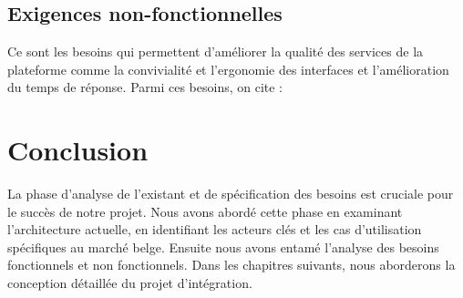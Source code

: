 \subsection{Exigences non-fonctionnelles}


Ce sont les besoins qui permettent d’améliorer la qualité des services de la plateforme comme la convivialité et l’ergonomie des interfaces et l’amélioration du temps de réponse. Parmi ces besoins, on cite :

\section*{Conclusion}
La phase d'analyse de l'existant et de spécification des besoins est cruciale pour le succès de notre projet. Nous avons abordé cette phase en examinant l'architecture actuelle, en identifiant les acteurs clés et les cas d'utilisation spécifiques au marché belge. Ensuite nous avons entamé l'analyse des besoins fonctionnels et non fonctionnels. Dans les chapitres suivants, nous aborderons la conception détaillée du projet d'intégration.